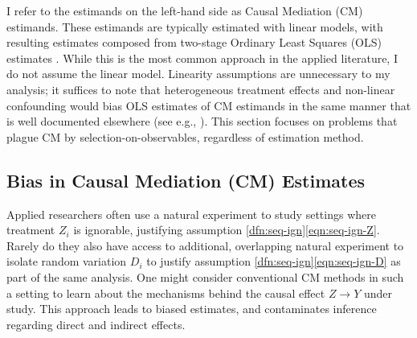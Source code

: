 I refer to the estimands on the left-hand side as Causal Mediation (CM) estimands.
These estimands are typically estimated with linear models, with resulting estimates composed from two-stage Ordinary Least Squares (OLS) estimates \citep{imai2010identification}.
While this is the most common approach in the applied literature, I do not assume the linear model.
Linearity assumptions are unnecessary to my analysis; it suffices to note that heterogeneous treatment effects and non-linear confounding would bias OLS estimates of CM estimands in the same manner that is well documented elsewhere (see e.g., \citealt{angrist1998estimating,sloczynski2022interpreting}).
This section focuses on problems that plague CM by selection-on-observables, regardless of estimation method.

\subsection{Bias in Causal Mediation (CM) Estimates}
Applied researchers often use a natural experiment to study settings where treatment $Z_i$ is ignorable, justifying assumption \ref{dfn:seq-ign}\eqref{eqn:seq-ign-Z}.
Rarely do they also have access to additional, overlapping natural experiment to isolate random variation $D_i$ to justify assumption \ref{dfn:seq-ign}\eqref{eqn:seq-ign-D} as part of the same analysis.
One might consider conventional CM methods in such a setting to learn about the mechanisms behind the causal effect $Z \to Y$ under study.
This approach leads to biased estimates, and contaminates inference regarding direct and indirect effects.

